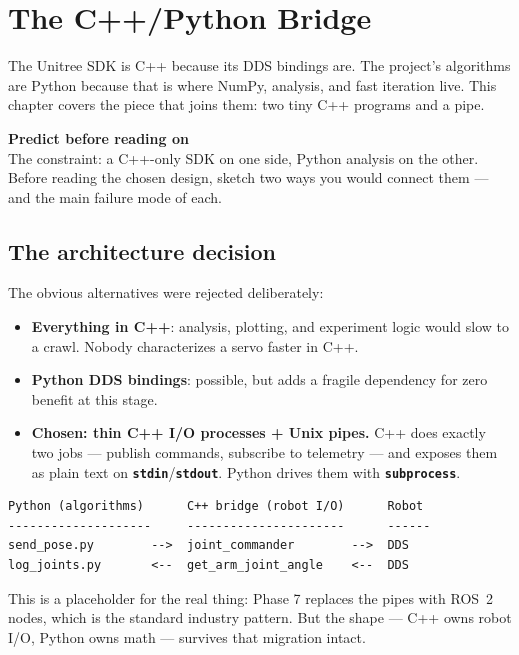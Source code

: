 \documentclass[11pt,twoside,openright]{book}
\newcommand{\code}[1]{\texttt{\bfseries #1}}
\newenvironment{pktpredict}{\begin{pktpredictbox}\textbf{\color{accentorange}Predict before reading on}\\[4pt]}{\end{pktpredictbox}}
\begin{document}

\chapter{The C++/Python Bridge}\label{ch:bridge}

The Unitree SDK is C++ because its DDS bindings are. The project's
algorithms are Python because that is where NumPy, analysis, and fast
iteration live. This chapter covers the piece that joins them: two tiny
C++ programs and a pipe.

\begin{pktpredict}
The constraint: a C++-only SDK on one side, Python analysis on the
other. Before reading the chosen design, sketch two ways you would
connect them --- and the main failure mode of each.
\end{pktpredict}

\section{The architecture decision}

The obvious alternatives were rejected deliberately:

\begin{itemize}
  \item \textbf{Everything in C++}: analysis, plotting, and experiment
    logic would slow to a crawl. Nobody characterizes a servo faster in
    C++.
  \item \textbf{Python DDS bindings}: possible, but adds a fragile
    dependency for zero benefit at this stage.
  \item \textbf{Chosen: thin C++ I/O processes + Unix pipes.} C++ does
    exactly two jobs --- publish commands, subscribe to telemetry --- and
    exposes them as plain text on \code{stdin}/\code{stdout}. Python
    drives them with \code{subprocess}.
\end{itemize}

\begin{lstlisting}
Python (algorithms)      C++ bridge (robot I/O)      Robot
--------------------     ----------------------      ------
send_pose.py        -->  joint_commander        -->  DDS
log_joints.py       <--  get_arm_joint_angle    <--  DDS
\end{lstlisting}

This is a placeholder for the real thing: Phase 7 replaces the pipes with
ROS~2 nodes, which is the standard industry pattern. But the shape ---
C++ owns robot I/O, Python owns math --- survives that migration intact.
\end{document}
